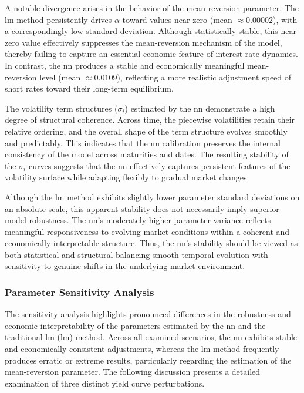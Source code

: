 A notable divergence arises in the behavior of the mean-reversion parameter. The \ac{lm} method persistently drives \(\alpha\) toward values near zero (mean \(\approx 0.00002\)), with a correspondingly low standard deviation. Although statistically stable, this near-zero value effectively suppresses the mean-reversion mechanism of the model, thereby failing to capture an essential economic feature of interest rate dynamics. In contrast, the \ac{nn} produces a stable and economically meaningful mean-reversion level (mean \(\approx 0.0109\)), reflecting a more realistic adjustment speed of short rates toward their long-term equilibrium.

The volatility term structures (\(\sigma_i\)) estimated by the \ac{nn} demonstrate a high degree of structural coherence. Across time, the piecewise volatilities retain their relative ordering, and the overall shape of the term structure evolves smoothly and predictably. This indicates that the \ac{nn} calibration preserves the internal consistency of the model across maturities and dates. The resulting stability of the \(\sigma_i\) curves suggests that the \ac{nn} effectively captures persistent features of the volatility surface while adapting flexibly to gradual market changes.

Although the \ac{lm} method exhibits slightly lower parameter standard deviations on an absolute scale, this apparent stability does not necessarily imply superior model robustness. The \ac{nn}'s moderately higher parameter variance reflects meaningful responsiveness to evolving market conditions within a coherent and economically interpretable structure. Thus, the \ac{nn}'s stability should be viewed as both statistical and structural-balancing smooth temporal evolution with sensitivity to genuine shifts in the underlying market environment.

\subsubsection{Parameter Sensitivity Analysis}
The sensitivity analysis highlights pronounced differences in the robustness and economic interpretability of the parameters estimated by the \ac{nn} and the traditional \ac{lm} (\ac{lm}) method. Across all examined scenarios, the \ac{nn} exhibits stable and economically consistent adjustments, whereas the \ac{lm} method frequently produces erratic or extreme results, particularly regarding the estimation of the mean-reversion parameter. The following discussion presents a detailed examination of three distinct yield curve perturbations.

